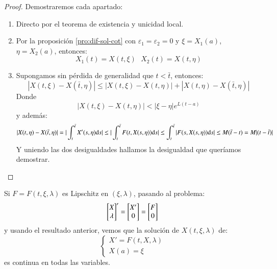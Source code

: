 \begin{proof}
    Demostraremos cada apartado:
    \begin{enumerate}
        \item Directo por el teorema de existencia y unicidad local.
        \item Por la proposición \ref{pro:dif-sol-cot} con $\varepsilon_1 = \varepsilon_2 = 0$ y $\xi = X_1(a)$, $\eta = X_2(a)$, entonces:
        $$
            X_1(t) = X(t, \xi)\ \ \ X_2(t) = X(t, \eta)
        $$
        \item Supongamos sin pérdida de generalidad que $t < \bar{t}$, entonces:
        $$
            |X(t, \xi) - X(\bar{t}, \eta)| \leq |X(t, \xi) - X(t, \eta)| + |X(t,\eta) - X(\bar{t}, \eta)|
        $$
        Donde
        $$
        |X(t, \xi) - X(t, \eta)| < |\xi - \eta| e^{L(t-a)}
        $$
        y además:
        $$
            |X(t,\eta) - X(\bar{t}, \eta)| = |\int_t^{\bar{t}} X'(s, \eta) \mathrm{d} s| \leq |\int_t^{\bar{t}} F(t, X(s, \eta)) \mathrm{d} s | \leq \int_t^{\bar{t}} |F(s, X(s, \eta)) \mathrm{d} s | \leq M(\bar{t} - t) = M|(t-\bar{t})|
        $$
        Y uniendo las dos desigualdades hallamos la desigualdad que queríamos demostrar.
    \end{enumerate}
\end{proof}
\begin{cor}
    Si $F = F(t, \xi, \lambda)$ es Lipschitz en $(\xi, \lambda)$, pasando al problema:
    $$
        \mx{X\\\lambda}' = \mx{X'\\ 0} = \mx{F\\0}
    $$
    y usando el resultado anterior, vemos que la solución de $X(t, \xi, \lambda)$ de:
    $$
        \begin{cases}
            X' = F(t, X, \lambda)\\
            X(a) = \xi
        \end{cases}
    $$
    es continua en todas las variables.
\end{cor}

